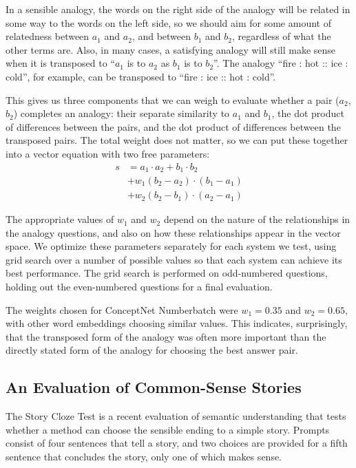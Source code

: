 \documentclass[letterpaper]{article}
\begin{document}
In a sensible analogy, the words on the right side of the analogy will be
related in some way to the words on the left side, so we should aim for some
amount of relatedness between $a_1$ and $a_2$, and between $b_1$ and $b_2$,
regardless of what the other terms are. Also, in many cases, a satisfying
analogy will still make sense when it is transposed to ``$a_1$ is to $a_2$ as
$b_1$ is to $b_2$''. The analogy ``fire : hot :: ice : cold'', for example, can
be transposed to ``fire : ice :: hot : cold''.

This gives us three components that we can weigh to evaluate whether a pair
($a_2$, $b_2$) completes an analogy: their separate similarity to $a_1$ and
$b_1$, the dot product of differences between the pairs, and the dot product of
differences between the transposed pairs.  The total weight does not matter, so
we can put these together into a vector equation with two free parameters:
\begin{equation}
    \begin{split}
        s &= a_1 \cdot a_2 + b_1 \cdot b_2\\
          &  + w_1(b_2 - a_2) \cdot (b_1 - a_1)\\
          &  + w_2(b_2 - b_1) \cdot (a_2 - a_1)
    \end{split}
\end{equation}

The appropriate values of $w_1$ and $w_2$ depend on the nature of the
relationships in the analogy questions, and also on how these relationships
appear in the vector space. We optimize these parameters separately for each
system we test, using grid search over a number of possible values so that each
system can achieve its best performance. The grid search is performed on
odd-numbered questions, holding out the even-numbered questions for a final
evaluation.

The weights chosen for ConceptNet Numberbatch were $w_1 = 0.35$ and $w_2 =
0.65$, with other word embeddings choosing similar values. This indicates,
surprisingly, that the transposed form of the analogy was often more important
than the directly stated form of the analogy for choosing the best answer pair.

\subsection{An Evaluation of Common-Sense Stories}
\label{story-evaluation}

The Story Cloze Test \cite{mostafazadeh2016cloze} is a recent evaluation of
semantic understanding that tests whether a method can choose the sensible
ending to a simple story. Prompts consist of four sentences that tell a story,
and two choices are provided for a fifth sentence that concludes the story,
only one of which makes sense.
\end{document}
